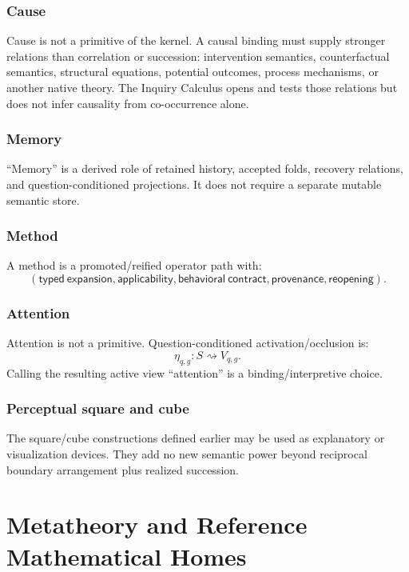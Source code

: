 \documentclass[11pt,oneside]{article}
\begin{document}
\section{Cause}

Cause is not a primitive of the kernel.  A causal binding must supply stronger relations than correlation or succession: intervention semantics, counterfactual semantics, structural equations, potential outcomes, process mechanisms, or another native theory.  The Inquiry Calculus opens and tests those relations but does not infer causality from co-occurrence alone.

\section{Memory}

``Memory'' is a derived role of retained history, accepted folds, recovery relations, and question-conditioned projections.  It does not require a separate mutable semantic store.

\section{Method}

A method is a promoted/reified operator path with:
\[
(\mathsf{typed\ expansion},\mathsf{applicability},\mathsf{behavioral\ contract},
\mathsf{provenance},\mathsf{reopening}).
\]

\section{Attention}

Attention is not a primitive.  Question-conditioned activation/occlusion is:
\[
\eta_{q,g}:S\rightsquigarrow V_{q,g}.
\]
Calling the resulting active view ``attention'' is a binding/interpretive choice.

\section{Perceptual square and cube}

The square/cube constructions defined earlier may be used as explanatory or visualization devices.  They add no new semantic power beyond reciprocal boundary arrangement plus realized succession.

\part{Metatheory and Reference Mathematical Homes}
\end{document}
